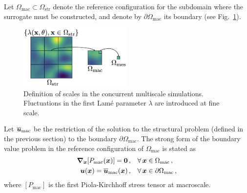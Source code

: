 Let $\Omega_\text{mac} \subset \Omega_\text{str}$ denote the reference configuration for the subdomain where the surrogate must be constructed, and denote by $\partial \Omega_\text{mac}$ its boundary (see Fig.~\ref{fig:scales}).
\begin{figure}[!htb]
    \begin{center}
        \includegraphics[width = 0.5\textwidth]{Pictures/Fig-Scales.png}
    \end{center}
    \caption[Definition of scales in the concurrent multiscale simulations.]{Definition of scales in the concurrent multiscale simulations. Fluctuations in the first Lam\'e parameter $\lambda$ are introduced at fine scale.}
    \label{fig:scales}
\end{figure}
Let $\overline{{\boldsymbol{u}}}_{\text{mac}}$ be the restriction of the solution to the structural problem (defined in the previous section) to the boundary $\partial \Omega_\text{mac}$. The strong form of the boundary value problem in the reference configuration of $\Omega_\text{mac}$ is stated as
\begin{align}
    \boldsymbol{\nabla}_{{\boldsymbol{x}}} [P_\text{mac}({\boldsymbol{x}})] = {\mathbf{0}}\,,& \quad \forall\,{\boldsymbol{x}} \in \Omega_\text{mac}\,,\\
    {\boldsymbol{u}}({\boldsymbol{x}}) = \overline{{\boldsymbol{u}}}_{\text{mac}}({\boldsymbol{x}})\,,& \quad \forall\, {\boldsymbol{x}} \in \partial \Omega_\text{mac}\,,
\end{align}
where $[P_\text{mac}]$ is the first Piola-Kirchhoff stress tensor at macroscale. %

